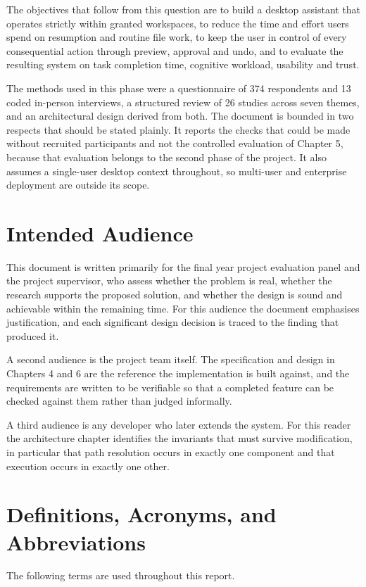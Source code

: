 \documentclass{FastFyp}
\begin{document}
The objectives that follow from this question are to build a desktop assistant that operates strictly within granted workspaces, to reduce the time and effort users spend on resumption and routine file work, to keep the user in control of every consequential action through preview, approval and undo, and to evaluate the resulting system on task completion time, cognitive workload, usability and trust.

The methods used in this phase were a questionnaire of 374 respondents and 13 coded in-person interviews, a structured review of 26 studies across seven themes, and an architectural design derived from both. The document is bounded in two respects that should be stated plainly. It reports the checks that could be made without recruited participants and not the controlled evaluation of Chapter 5, because that evaluation belongs to the second phase of the project. It also assumes a single-user desktop context throughout, so multi-user and enterprise deployment are outside its scope.

\section{Intended Audience}
This document is written primarily for the final year project evaluation panel and the project supervisor, who assess whether the problem is real, whether the research supports the proposed solution, and whether the design is sound and achievable within the remaining time. For this audience the document emphasises justification, and each significant design decision is traced to the finding that produced it.

A second audience is the project team itself. The specification and design in Chapters 4 and 6 are the reference the implementation is built against, and the requirements are written to be verifiable so that a completed feature can be checked against them rather than judged informally.

A third audience is any developer who later extends the system. For this reader the architecture chapter identifies the invariants that must survive modification, in particular that path resolution occurs in exactly one component and that execution occurs in exactly one other.

\section{Definitions, Acronyms, and Abbreviations}
The following terms are used throughout this report.
\end{document}
